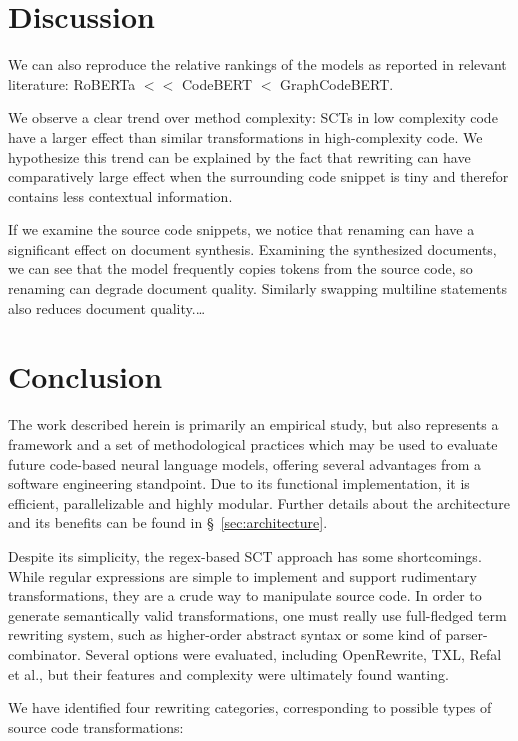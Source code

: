 \documentclass[sigconf,review,anonymous]{acmart}
\begin{document}
  \section{Discussion}


  We can also reproduce the relative rankings of the models as reported in relevant literature: RoBERTa $<<$ CodeBERT $<$ GraphCodeBERT.

  We observe a clear trend over method complexity: SCTs in low complexity code have a larger effect than similar transformations in high-complexity code. We hypothesize this trend can be explained by the fact that rewriting can have comparatively large effect when the surrounding code snippet is tiny and therefor contains less contextual information.

  If we examine the source code snippets, we notice that renaming can have a significant effect on document synthesis. Examining the synthesized documents, we can see that the model frequently copies tokens from the source code, so renaming can degrade document quality. Similarly swapping multiline statements also reduces document quality.\ldots

  \pagebreak
  \section{Conclusion}\label{sec:conclusion}

  The work described herein is primarily an empirical study, but also represents a framework and a set of methodological practices which may be used to evaluate future code-based neural language models, offering several advantages from a software engineering standpoint. Due to its functional implementation, it is efficient, parallelizable and highly modular. Further details about the architecture and its benefits can be found in \S~\ref{sec:architecture}.

  Despite its simplicity, the regex-based SCT approach has some shortcomings. While regular expressions are simple to implement and support rudimentary transformations, they are a crude way to manipulate source code. In order to generate semantically valid transformations, one must really use full-fledged term rewriting system, such as higher-order abstract syntax or some kind of parser-combinator. Several options were evaluated, including OpenRewrite, TXL, Refal et al., but their features and complexity were ultimately found wanting.

  We have identified four rewriting categories, corresponding to possible types of source code transformations:
\end{document}
